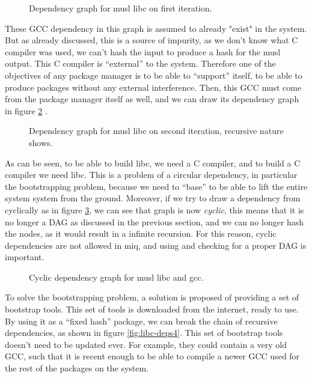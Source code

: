 \begin{figure}[hbt]
    \centerfloat
    
    \caption{Dependency graph for musl libc on first iteration.}
    \label{fig:libc-deps}
\end{figure}

These GCC dependency in this graph is assumed to already
"exist" in the system. But as already discussed, this is a
source of impurity, as we don't know what C compiler was
used, we can't hash the input to produce a hash for the musl
output. This C compiler is ``external'' to the system.
Therefore one of the objectives of any package manager is to
be able to ``support'' itself, to be able to produce
packages without any external interference. Then, this GCC
must come from the package manager itself as well, and we
can draw its dependency graph in figure \ref{fig:libc-deps2} .

\begin{figure}[hbt]
    \centerfloat
    
    \caption{Dependency graph for musl libc on second iteration, recursive nature shows.}
    \label{fig:libc-deps2}
\end{figure}

As can be seen, to be able to build libc, we need a C
compiler, and to build a C compiler we need libc. This is a
problem of a circular dependency, in particular the
bootstrapping problem, because we need to ``base'' to be
able to lift the entire system system from the ground.
Moreover, if we try to draw a dependency from cyclically as
in figure \ref{fig:libc-deps3}, we can see that graph is now
\emph{cyclic}, this means that it is no longer a \ac{DAG} as
discussed in the previous section, and we can no longer hash
the nodes, as it would result in a infinite recursion. For
this reason, cyclic dependencies are not allowed in miq, and
using and checking for a proper \ac{DAG} is important.

\begin{figure}[hbt]
    \centerfloat
    
    \caption{Cyclic dependency graph for musl libc and gcc.}
    \label{fig:libc-deps3}
\end{figure}

To solve the bootstrapping problem, a solution is proposed
of providing a set of bootstrap tools. This set of tools is
downloaded from the internet, ready to use. By using it as a
``fixed hash'' package, we can break the chain of recursive
dependencies, as shown in figure \ref{fig:libc-deps4}. This
set of bootstrap tools doesn't need to be updated ever. For
example, they could contain a very old GCC, such that it is
recent enough to be able to compile a newer GCC used for the
rest of the packages on the system.

